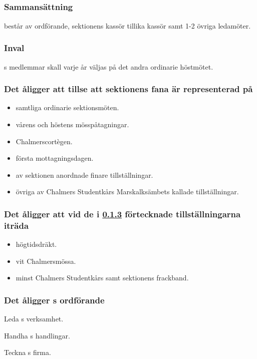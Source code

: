 \subsection{\FANBARERITFULL}
\subsubsection{Sammansättning}
\FANBARERIT{} består av ordförande, sektionens kassör tillika kassör samt 1-2 övriga ledamöter.

\subsubsection{Inval}
\FANBARERIT{}s medlemmar skall varje år väljas på det andra ordinarie höstmötet.

\subsubsection{Det åligger \FANBARERIT att tillse att sektionens fana är representerad på}
\label{sec:fanbarerit:function}
\begin{itemize}
	\item samtliga ordinarie sektionsmöten.
	\item vårens och höstens mösspåtagningar.
	\item Chalmerscortègen.
	\item första mottagningsdagen.
	\item av sektionen anordnade finare tillställningar.
	\item övriga av Chalmers Studentkårs Marskalksämbets kallade tillställningar.
\end{itemize}

\subsubsection{Det åligger \FANBARERIT{} att vid de i \ref{sec:fanbarerit:function} förtecknade tillställningarna iträda}
\begin{itemize}
	\item högtidsdräkt.
	\item vit Chalmersmössa.
	\item minst Chalmers Studentkårs samt sektionens frackband.
\end{itemize}

\subsubsection{Det åligger \FANBARERIT{}s ordförande}
\begin{att}
	\item Leda \FANBARERIT{}s verksamhet.
	\item Handha \FANBARERIT{}s handlingar.
	\item Teckna \FANBARERIT{}s firma.
\end{att}

